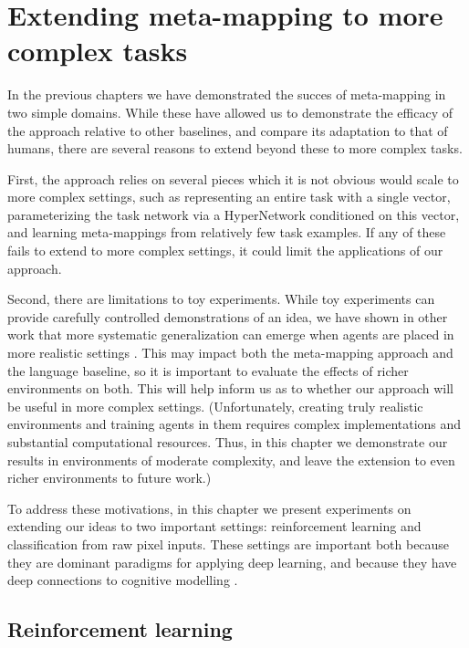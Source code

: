 \chapter{Extending meta-mapping to more complex tasks} \label{chapter:extending}
In the previous chapters we have demonstrated the succes of meta-mapping in two simple domains. While these have allowed us to demonstrate the efficacy of the approach relative to other baselines, and compare its adaptation to that of humans, there are several reasons to extend beyond these to more complex tasks. \par 
First, the approach relies on several pieces which it is not obvious would scale to more complex settings, such as representing an entire task with a single vector, parameterizing the task network via a HyperNetwork conditioned on this vector, and learning meta-mappings from relatively few task examples. If any of these fails to extend to more complex settings, it could limit the applications of our approach. \par
Second, there are limitations to toy experiments. While toy experiments can provide carefully controlled demonstrations of an idea, we have shown in other work that more systematic generalization can emerge when agents are placed in more realistic settings \citep{Hill2019a}. This may impact both the meta-mapping approach and the language baseline, so it is important to evaluate the effects of richer environments on both. This will help inform us as to whether our approach will be useful in more complex settings. (Unfortunately, creating truly realistic environments and training agents in them requires complex implementations and substantial computational resources. Thus, in this chapter we demonstrate our results in environments of moderate complexity, and leave the extension to even richer environments to future work.)\par 
To address these motivations, in this chapter we present experiments on extending our ideas to two important settings: reinforcement learning and classification from raw pixel inputs. These settings are important both because they are dominant paradigms for applying deep learning, and because they have deep connections to cognitive modelling \citep[e.g.][]{Yamins2014, Kriegeskorte2015, Momennejad2017}. \par

\section{Reinforcement learning}


